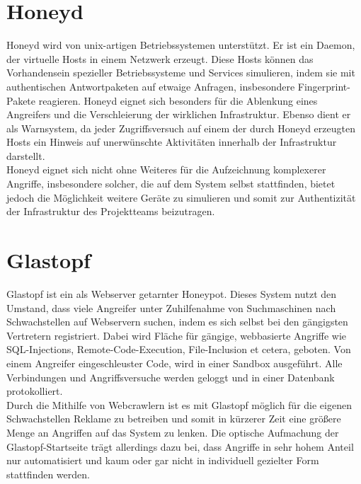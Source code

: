 \section{Honeyd}
\label{sec:Honeyd}
Honeyd wird von unix-artigen Betriebssystemen unterstützt. Er ist ein Daemon, der virtuelle Hosts in einem Netzwerk erzeugt. Diese Hosts können das Vorhandensein spezieller Betriebssysteme und Services simulieren, indem sie mit authentischen Antwortpaketen auf etwaige Anfragen, insbesondere Fingerprint-Pakete reagieren. Honeyd eignet sich besonders für die Ablenkung eines Angreifers und die Verschleierung der wirklichen Infrastruktur. Ebenso  dient er als Warnsystem, da jeder Zugriffsversuch auf einem der durch Honeyd erzeugten Hosts ein Hinweis auf unerwünschte Aktivitäten innerhalb der Infrastruktur darstellt.\\

Honeyd eignet sich nicht ohne Weiteres für die Aufzeichnung komplexerer Angriffe, insbesondere solcher, die auf dem System selbst stattfinden, bietet jedoch die Möglichkeit weitere Geräte zu simulieren und somit zur Authentizität der Infrastruktur des Projektteams beizutragen.

\section{Glastopf}
\label{sec:Glastopf}

Glastopf ist ein als Webserver getarnter Honeypot. Dieses System nutzt den Umstand, dass viele Angreifer unter Zuhilfenahme von Suchmaschinen nach Schwachstellen auf Webservern suchen, indem es sich selbst bei den gängigsten Vertretern registriert. Dabei wird Fläche für gängige, webbasierte Angriffe wie SQL-Injections, Remote-Code-Execution, File-Inclusion et cetera, geboten. Von einem Angreifer eingeschleuster Code, wird in einer Sandbox ausgeführt. Alle Verbindungen und Angriffsversuche werden geloggt und in einer Datenbank protokolliert.\\

Durch die Mithilfe von Webcrawlern ist es mit Glastopf möglich für die eigenen Schwachstellen Reklame zu betreiben und somit in kürzerer Zeit eine größere Menge an Angriffen auf das System zu lenken. Die optische Aufmachung der Glastopf-Startseite trägt allerdings dazu bei, dass Angriffe in sehr hohem Anteil nur automatisiert und kaum oder gar nicht in individuell gezielter Form stattfinden werden.